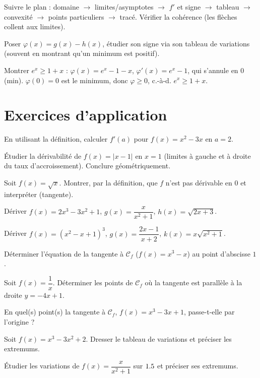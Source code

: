 Suivre le plan : domaine $\to$ limites/asymptotes $\to$ $f'$ et signe $\to$ tableau $\to$
convexité $\to$ points particuliers $\to$ tracé. Vérifier la cohérence (les flèches collent aux limites).

Poser $\varphi(x)=g(x)-h(x)$, étudier son signe via son tableau de variations
(souvent en montrant qu'un minimum est positif).
\begin{exemple}
Montrer $e^{x}\ge1+x$ : $\varphi(x)=e^{x}-1-x$, $\varphi'(x)=e^{x}-1$, qui s'annule en $0$
(min). $\varphi(0)=0$ est le minimum, donc $\varphi\ge0$, c.-à-d. $e^{x}\ge1+x$.
\end{exemple}

\section{Exercices d'application}

\exo{} En utilisant la définition, calculer $f'(a)$ pour $f(x)=x^{2}-3x$ en $a=2$.

\exo{} Étudier la dérivabilité de $f(x)=|x-1|$ en $x=1$ (limites à gauche et à droite du taux d'accroissement). Conclure géométriquement.

\exo{} Soit $f(x)=\sqrt{x}$. Montrer, par la définition, que $f$ n'est pas dérivable en $0$ et interpréter (tangente).

\exo{} Dériver $f(x)=2x^{3}-3x^{2}+1$, $g(x)=\dfrac{x}{x^{2}+1}$, $h(x)=\sqrt{2x+3}$.

\exo{} Dériver $f(x)=(x^{2}-x+1)^{3}$, $g(x)=\dfrac{2x-1}{x+2}$, $k(x)=x\sqrt{x^{2}+1}$.

\exo{} Déterminer l'équation de la tangente à $\mathcal C_f$ ($f(x)=x^{3}-x$) au point d'abscisse $1$.

\exo{} Soit $f(x)=\dfrac{1}{x}$. Déterminer les points de $\mathcal C_f$ où la tangente est parallèle à la droite $y=-4x+1$.

\exo{} En quel(s) point(s) la tangente à $\mathcal C_f$, $f(x)=x^{3}-3x+1$, passe-t-elle par l'origine ?

\exo{} Soit $f(x)=x^{3}-3x^{2}+2$. Dresser le tableau de variations et préciser les extremums.

\exo{} Étudier les variations de $f(x)=\dfrac{x}{x^{2}+1}$ sur $1.5$ et préciser ses extremums.

